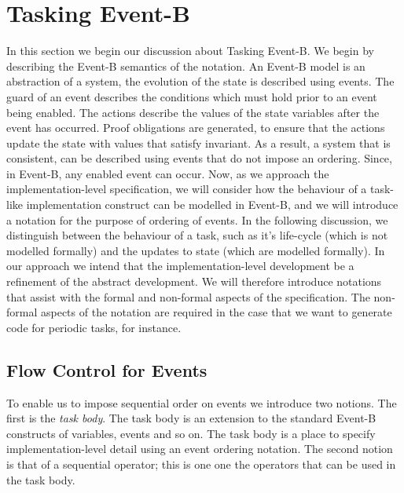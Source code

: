 \section{Tasking Event-B}\label{TEB}
In this section we begin our discussion about Tasking Event-B. We begin by describing the Event-B semantics of the notation. An Event-B model is an abstraction of a system, the evolution of the state is described using events. The guard of an event describes the conditions which must hold prior to an event being enabled. The actions describe the values of the state variables after the event has occurred. Proof obligations are generated, to ensure that the actions update the state with values that satisfy invariant. As a result, a system that is consistent, can be described using events that do not impose an ordering. Since, in Event-B, any enabled event can occur. Now, as we approach the implementation-level specification, we will consider how the behaviour of a task-like implementation construct can be modelled in Event-B, and we will introduce a notation for the purpose of ordering of events. In the following discussion, we distinguish between the behaviour of a task, such as it's life-cycle (which is not modelled formally) and the updates to state (which are modelled formally). In our approach we intend that the implementation-level development be a refinement of the abstract development. We will therefore introduce notations that assist with the formal and non-formal aspects of the specification. The non-formal aspects of the notation are required in the case that we want to generate code for periodic tasks, for instance. 

\subsection{Flow Control for Events}
To enable us to impose sequential order on events we introduce two notions. The first is the \emph{task body}. The task body is an extension to the standard Event-B constructs of variables, events and so on. The task body is a place to specify implementation-level detail using an event ordering notation. The second notion is that of a sequential operator; this is one one the operators that can be used in the task body.

